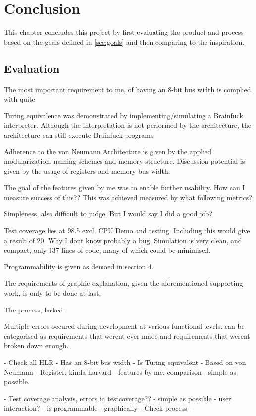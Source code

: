\chapter{Conclusion} \label{chap:conclusion}
This chapter concludes this project by first evaluating the product and process based on the goals defined in \ref{sec:goals} and then comparing to the inspiration.
\section{Evaluation}

The most important requirement to me, of having an 8-bit bus width is complied with quite

Turing equivalence was demonstrated by implementing/simulating a Brainfuck interpreter. Although the interpretation is not performed by the architecture, the architecture can still execute Brainfuck programs. 

Adherence to the von Neumann Architecture is given by the applied modularization, naming schemes and memory structure. Discussion potential is given by the usage of registers and memory bus width. 

The goal of the features given by me was to enable further usability. How can I measure success of this?? This was achieved measured by what following metrics?

Simpleness, also difficult to judge. But I would say I did a good job?

Test coverage lies at  98.5 excl. CPU Demo and testing. Including this would give a result of 20. Why I dont know probably a bug. 
Simulation is very clean, and compact, only 137 lines of code, many of which could be minimised.

Programmability is given as demoed in section 4.

The requirements of graphic explanation, given the aforementioned supporting work, is only to be done at last.

The process, lacked. 

Multiple errors occured during development at various functional levels. 
can be categorised as requirements that werent ever made
and requirements that werent broken down enough.



- Check all HLR 
    - Has an 8-bit bus width
    - Is Turing equivalent
    - Based on von Neumann
        - Register, kinda harvard
    - features by me, comparison
    - simple as possible.

    - Test coverage analysis, errors in testcoverage??
    - simple as possible
    - user interaction?
    - is programmable
    - graphically
- Check process
    - 
